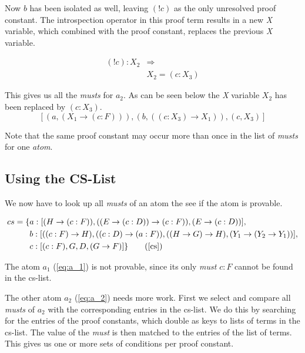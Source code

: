 Now $b$ has been isolated as well, leaving $(! c)$ as the only unresolved proof constant. The introspection operator in this proof term results in a new \emph{X} variable, which combined with the proof constant, replaces the previous \emph{X} variable.

\begin{equation*}
	\begin{split}
		(! c) : X_2 & \Rightarrow \\
		& X_2 = (c:X_3)
	\end{split}	
\end{equation*}

This gives us all the \emph{musts} for $a_2$. As can be seen below the \emph{X} variable $X_2$ has been replaced by $(c:X_3)$.
\begin{equation}\label{eq:a2_musts}
	[(a, (X_1 \rightarrow (c:F))), (b, ((c:X_3) \rightarrow X_1)), (c, X_3)]
\end{equation}

Note that the same proof constant may occur more than once in the list of \emph{musts} for one \emph{atom}. 

\subsection{Using the CS-List}
We now have to look up all \emph{musts} of an atom the see if the atom is provable.

\begin{align*}
	cs = \{& a: [(H \rightarrow (c:F)), ((E \rightarrow (c:D)) \rightarrow (c:F)), (E \rightarrow (c:D))],\\
	& b: [((c:F) \rightarrow H), ((c:D) \rightarrow (a:F)), ((H \rightarrow G) \rightarrow H), (Y_1 \rightarrow (Y_2 \rightarrow Y_1))],\\
	& c: [(c:F), G, D, (G \rightarrow F)]\}
	\tag{\ref{cs}}
\end{align*}

The atom $a_1$ (\ref{eq:a_1}) is not provable, since its only \emph{must} $c:F$ cannot be found in the cs-list.

The other atom $a_2$ (\ref{eq:a_2}) needs more work. First we select and compare all \emph{musts} of $a_2$ with the corresponding entries in the cs-list. We do this by searching for the entries of the proof constants, which double as keys to lists of terms in the cs-list. The value of the \emph{must} is then matched to the entries of the list of terms. This gives us one or more sets of conditions per proof constant.  

